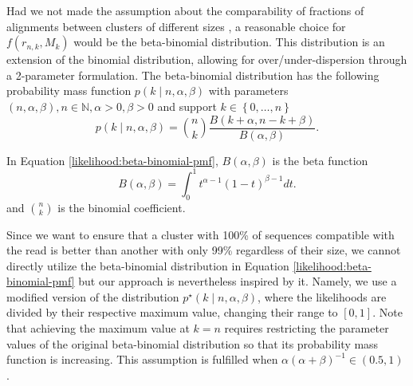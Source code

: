 \documentclass[officiallayout]{tktla}
\begin{document}
Had we not made the assumption about the comparability of fractions of
alignments between clusters of different sizes , a reasonable choice
for $f\left(r_{n, k}, M_{k}\right)$ would be the beta-binomial
distribution. This distribution is an extension of the binomial
distribution, allowing for over/under-dispersion through a 2-parameter
formulation. The beta-binomial distribution has the following
probability mass function $p\left(k \middle | n, \alpha, \beta\right)$
with parameters $\left(n, \alpha, \beta\right), n \in \mathbb{N},
\alpha > 0, \beta > 0$ and support $k \in \left\{0, \dots, n\right\}$
\begin{equation}
  \label{likelihood:beta-binomial-pmf}
  p\left(k \middle| n, \alpha, \beta\right) = \binom{n}{k}\frac{B\left(k + \alpha, n - k + \beta\right)}{B\left(\alpha, \beta\right)}.
\end{equation}

In Equation \ref{likelihood:beta-binomial-pmf}, $B\left(\alpha, \beta\right)$ is the beta function
\begin{equation}
  \label{likelihood:beta-function}
  B\left(\alpha, \beta\right) = \int_{0}^{1}t^{\alpha - 1}\left(1 - t\right)^{\beta - 1}dt.
\end{equation}
and $\binom{n}{k}$ is the binomial coefficient.

Since we want to ensure that a cluster with 100\% of sequences
compatible with the read is better than another with only 99\%
regardless of their size, we cannot directly utilize the beta-binomial
distribution in Equation \ref{likelihood:beta-binomial-pmf} but our
approach is nevertheless inspired by it. Namely, we use a modified
version of the distribution $p^{\star}\left(k \middle| n, \alpha,
\beta\right)$, where the likelihoods are divided by their respective
maximum value, changing their range to $\left[0, 1\right]$. Note that
achieving the maximum value at $k = n$ requires restricting the
parameter values of the original beta-binomial distribution so that
its probability mass function is increasing. This assumption is
fulfilled when $\alpha\left(\alpha + \beta\right)^{-1} \in \left(0.5,
1\right)$ \citep{berg1993condorcet}.
\end{document}
